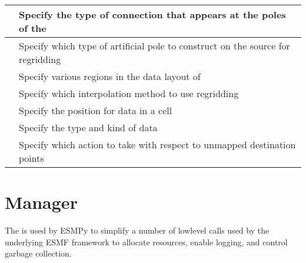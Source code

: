\documentclass[letterpaper,10pt,english]{sphinxmanual}
\begin{document}
\begin{savenotes}
\begin{tabulary}{\linewidth}[t]{|T|T|}
\hline
{\hyperref[\detokenize{PoleKind:ESMF.api.constants.PoleKind}]{}}
&
Specify the type of connection that appears at the poles of the {\hyperref[\detokenize{grid:ESMF.api.grid.Grid}]{}}
\\
\hline
{\hyperref[\detokenize{PoleMethod:ESMF.api.constants.PoleMethod}]{}}
&
Specify which type of artificial pole to construct on the source {\hyperref[\detokenize{grid:ESMF.api.grid.Grid}]{}} for regridding
\\
\hline
{\hyperref[\detokenize{Region:ESMF.api.constants.Region}]{}}
&
Specify various regions in the data layout of
\\
\hline
{\hyperref[\detokenize{RegridMethod:ESMF.api.constants.RegridMethod}]{}}
&
Specify which interpolation method to use regridding
\\
\hline
{\hyperref[\detokenize{StaggerLoc:ESMF.api.constants.StaggerLoc}]{}}
&
Specify the position for data in a {\hyperref[\detokenize{grid:ESMF.api.grid.Grid}]{}} cell
\\
\hline
{\hyperref[\detokenize{TypeKind:ESMF.api.constants.TypeKind}]{}}
&
Specify the type and kind of data
\\
\hline
{\hyperref[\detokenize{UnmappedAction:ESMF.api.constants.UnmappedAction}]{}}
&
Specify which action to take with respect to unmapped destination points
\\
\hline
\end{tabulary}
\par
\sphinxattableend\end{savenotes}


\section{Manager}
\label{\detokenize{api:manager}}
The {\hyperref[\detokenize{manager:ESMF.api.esmpymanager.Manager}]{}} is used by ESMPy to simplify a
number of low\sphinxhyphen{}level calls used by the underlying ESMF framework to allocate
resources, enable logging, and control garbage collection.
\end{document}

